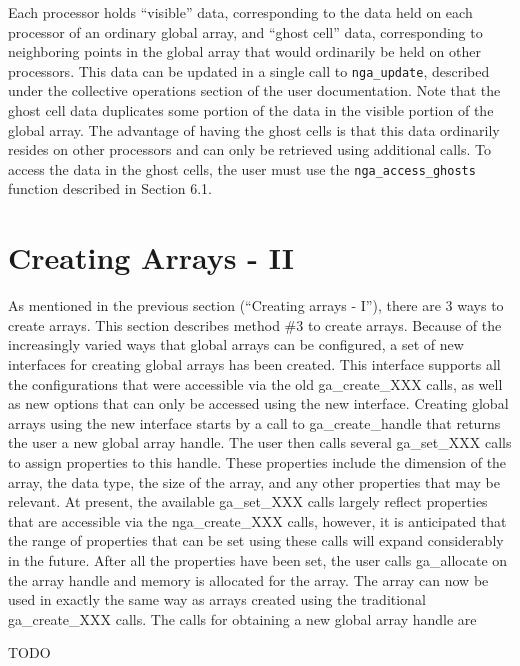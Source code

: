 Each processor holds ``visible'' data, corresponding to the data held on each
processor of an ordinary global array, and ``ghost cell'' data, corresponding
to neighboring points in the global array that would ordinarily be held on
other processors. This data can be updated in a single call to
\texttt{nga\_update}, described under the collective operations section of the
user documentation. Note that the ghost cell data duplicates some portion of
the data in the visible portion of the global array. The advantage of having
the ghost cells is that this data ordinarily resides on other processors and
can only be retrieved using additional calls. To access the data in the ghost
cells, the user must use the \texttt{nga\_access\_ghosts} function described in
Section 6.1. 

\section{Creating Arrays - II}

As mentioned in the previous section (``Creating arrays - I''), there are 3
ways to create arrays. This section describes method \#3 to create arrays.
Because of the increasingly varied ways that global arrays can be configured, a
set of new interfaces for creating global arrays has been created. This
interface supports all the configurations that were accessible via the old
ga\_create\_XXX calls, as well as new options that can only be accessed using
the new interface. Creating global arrays using the new interface starts by a
call to ga\_create\_handle that returns the user a new global array handle. The
user then calls several ga\_set\_XXX calls to assign properties to this handle.
These properties include the dimension of the array, the data type, the size of
the array, and any other properties that may be relevant. At present, the
available ga\_set\_XXX calls largely reflect properties that are accessible via
the nga\_create\_XXX calls, however, it is anticipated that the range of
properties that can be set using these calls will expand considerably in the
future.  After all the properties have been set, the user calls ga\_allocate on
the array handle and memory is allocated for the array. The array can now be
used in exactly the same way as arrays created using the traditional
ga\_create\_XXX calls. The calls for obtaining a new global array handle are

TODO
%

